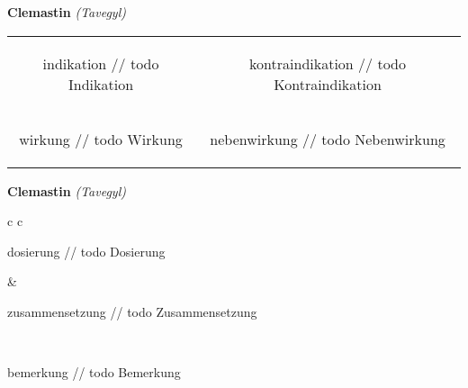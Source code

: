 \documentclass[12pt]{beamer}
\begin{document}
\begin{frame}{
    \textbf{Clemastin}
    \textit{(Tavegyl)}
}
    \begin{tabular}{c c}
        \begin{beamercolorbox}[wd=\boxwidth\textwidth,ht=\boxheight\textheight,sep=1em]{indikation}
        // todo Indikation
        \end{beamercolorbox} & 
        \begin{beamercolorbox}[wd=\boxwidth\textwidth,ht=\boxheight\textheight,sep=1em]{kontraindikation}
        // todo Kontraindikation 
        \end{beamercolorbox} \\
        \begin{beamercolorbox}[wd=\boxwidth\textwidth,ht=\boxheight\textheight,sep=1em]{wirkung}
        // todo Wirkung
        \end{beamercolorbox} & 
        \begin{beamercolorbox}[wd=\boxwidth\textwidth,ht=\boxheight\textheight,sep=1em]{nebenwirkung}
        // todo Nebenwirkung
        \end{beamercolorbox} \\
    \end{tabular}
\end{frame}

\begin{frame}{
    \textbf{Clemastin}
    \textit{(Tavegyl)}
}
    \begin{tabular}{c c}
        \begin{beamercolorbox}[wd=\boxwidth\textwidth,ht=\boxheight\textheight,sep=1em]{dosierung}
        // todo Dosierung
        \end{beamercolorbox} & 
        \begin{beamercolorbox}[wd=\boxwidth\textwidth,ht=\boxheight\textheight,sep=1em]{zusammensetzung}
        // todo Zusammensetzung
        \end{beamercolorbox} \\
        \begin{beamercolorbox}[wd=\textwidth,ht=\boxheight\textheight,sep=1em]{bemerkung}
        // todo Bemerkung
        \end{beamercolorbox} \\
    \end{tabular}
\end{frame}
\end{document}
